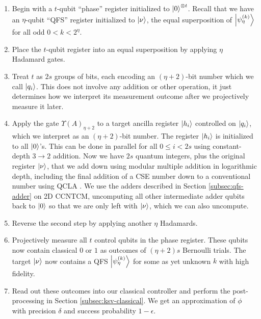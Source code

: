 \begin{enumerate}

\item Begin with a $t$-qubit ``phase'' register initialized to $\left\vert{0}\right\rangle^{\otimes t}$.
Recall that we have an ${\eta}$-qubit ``QFS'' register initialized to $\left\vert{\nu}\right\rangle$, the
equal superposition of $\left\vert{\psi_{\eta}^{(k)}}\right\rangle$ for all odd $0 < k  < 2^{\eta}$.

\item Place the $t$-qubit register into an equal superposition by
applying ${\eta}$ Hadamard gates.

\item Treat $t$ as $2s$ groups of bits, each encoding an $({\eta}+2)$-bit number
which we call $\left\vert{q_i}\right\rangle$.
This does not involve any addition or other operation, it just determines
how we interpret its measurement outcome after we projectively measure it later.

\item Apply the gate $\Upsilon(A)_{{\eta}+2}$ to a target ancilla register $\left\vert{h_i}\right\rangle$ controlled
on $\left\vert{q_i}\right\rangle$, which we interpret as an $({\eta}+2)$-bit number. The register
$\left\vert{h_i}\right\rangle$ is initialized to all $\left\vert{0}\right\rangle$'s. This can be done in
parallel for all $0 \le i < 2s$ using constant-depth $3\rightarrow 2$ addition.
Now we have $2s$ quantum integers, plus
the original register $\left\vert{\nu}\right\rangle$, that we add down using modular multiple
addition in logarithmic depth, including the final addition of a CSE number
down to a conventional number using QCLA \cite{Draper2004}. We use the adders described
in Section \ref{subsec:qfs-adder} on \textsf{2D CCNTCM}, uncomputing all
other intermediate adder qubits back to $\left\vert{0}\right\rangle$
so that we are only left with $\left\vert{\nu}\right\rangle$, which we can also uncompute.

\item Reverse the second step by applying another ${\eta}$ Hadamards.

\item Projectively measure all $t$ control
qubits in the phase register. These qubits
now contain classical $0$ or $1$ as outcomes of $({\eta}+2)s$ Bernoulli trials.
The target $\left\vert{\nu}\right\rangle$ now contains a QFS $\left\vert{\psi_{\eta}^{(k)}}\right\rangle$ for some
as yet unknown $k$ with high fidelity.

\item Read out these outcomes into our classical controller
and perform the post-processing in Section \ref{subsec:ksv-classical}.
We get an approximation of $\phi$ with precision $\delta$ and
success probability $1-\epsilon$.

\end{enumerate}

